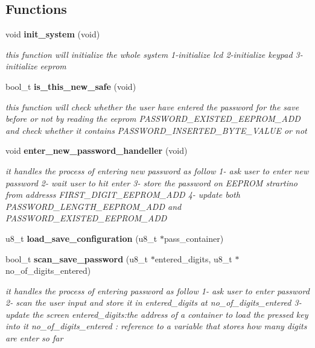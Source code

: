 \subsection*{Functions}
\begin{DoxyCompactItemize}
\item 
void \textbf{ init\+\_\+system} (void)
\begin{DoxyCompactList}\small\item\em this function will initialize the whole system 1-\/initialize lcd 2-\/initialize keypad 3-\/initialize eeprom \end{DoxyCompactList}\item 
bool\+\_\+t \textbf{ is\+\_\+this\+\_\+new\+\_\+safe} (void)
\begin{DoxyCompactList}\small\item\em this function will check whether the user have entered the password for the save before or not by reading the eeprom P\+A\+S\+S\+W\+O\+R\+D\+\_\+\+E\+X\+I\+S\+T\+E\+D\+\_\+\+E\+E\+P\+R\+O\+M\+\_\+\+A\+DD and check whether it contains P\+A\+S\+S\+W\+O\+R\+D\+\_\+\+I\+N\+S\+E\+R\+T\+E\+D\+\_\+\+B\+Y\+T\+E\+\_\+\+V\+A\+L\+UE or not \end{DoxyCompactList}\item 
void \textbf{ enter\+\_\+new\+\_\+password\+\_\+handeller} (void)
\begin{DoxyCompactList}\small\item\em it handles the process of entering new password as follow 1-\/ ask user to enter new password 2-\/ wait user to hit enter 3-\/ store the password on E\+E\+P\+R\+OM strartino from addresss F\+I\+R\+S\+T\+\_\+\+D\+I\+G\+I\+T\+\_\+\+E\+E\+P\+R\+O\+M\+\_\+\+A\+DD 4-\/ update both P\+A\+S\+S\+W\+O\+R\+D\+\_\+\+L\+E\+N\+G\+T\+H\+\_\+\+E\+E\+P\+R\+O\+M\+\_\+\+A\+DD and P\+A\+S\+S\+W\+O\+R\+D\+\_\+\+E\+X\+I\+S\+T\+E\+D\+\_\+\+E\+E\+P\+R\+O\+M\+\_\+\+A\+DD \end{DoxyCompactList}\item 
u8\+\_\+t \textbf{ load\+\_\+save\+\_\+configuration} (u8\+\_\+t $\ast$pass\+\_\+container)
\item 
bool\+\_\+t \textbf{ scan\+\_\+save\+\_\+password} (u8\+\_\+t $\ast$entered\+\_\+digits, u8\+\_\+t $\ast$no\+\_\+of\+\_\+digits\+\_\+entered)
\begin{DoxyCompactList}\small\item\em it handles the process of entering password as follow 1-\/ ask user to enter password 2-\/ scan the user input and store it in entered\+\_\+digits at no\+\_\+of\+\_\+digits\+\_\+entered 3-\/ update the screen  entered\+\_\+digits\+:the address of a container to load the pressed key into it  no\+\_\+of\+\_\+digits\+\_\+entered \+: reference to a variable that stores how many digits are enter so far \end{DoxyCompactList}\item 

\end{DoxyCompactItemize}

